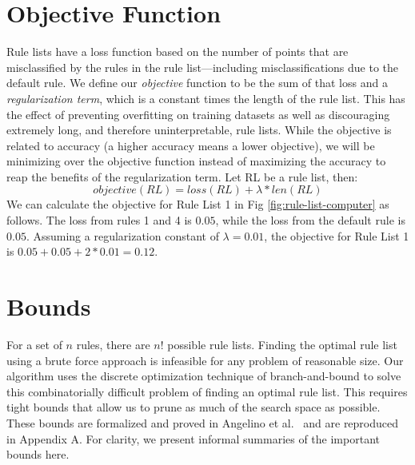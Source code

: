 \section{Objective Function}
Rule lists have a loss function based on the number of points that are misclassified by the rules in the rule list---including misclassifications due to the default rule.
We define our \textit{objective} function to be the sum of that loss and a \textit{regularization term}, which is a constant times the length of the rule list.
This has the effect of preventing overfitting on training datasets as well as discouraging extremely long, and therefore uninterpretable, rule lists.
While the objective is related to accuracy (a higher accuracy means a lower objective), we will be minimizing over the objective function instead of maximizing the accuracy to reap the benefits of the regularization term.
Let RL be a rule list, then:
$$objective(RL) = loss(RL) + \lambda * len(RL)$$
We can calculate the objective for Rule List 1 in Fig \ref{fig:rule-list-computer} as follows.
The loss from rules 1 and 4 is $0.05$, while the loss from the default rule is $0.05$.
Assuming a regularization constant of $\lambda=0.01$, the objective for Rule List  1 is $0.05 + 0.05 + 2 * 0.01 = 0.12$.

\section{Bounds}\label{sec:bounds}
For a set of $n$ rules, there are $n!$ possible rule lists.
Finding the optimal rule list using a brute force approach is infeasible for any problem of reasonable size.
Our algorithm uses the discrete optimization technique of branch-and-bound to solve this combinatorially difficult problem of finding an optimal rule list.
This requires tight bounds that allow us to prune as much of the search space as possible.
These bounds are formalized and proved in Angelino et al.~\cite{AngelinoLaAlSeRu17} and are reproduced in Appendix A.
For clarity, we present informal summaries of the important bounds here.

